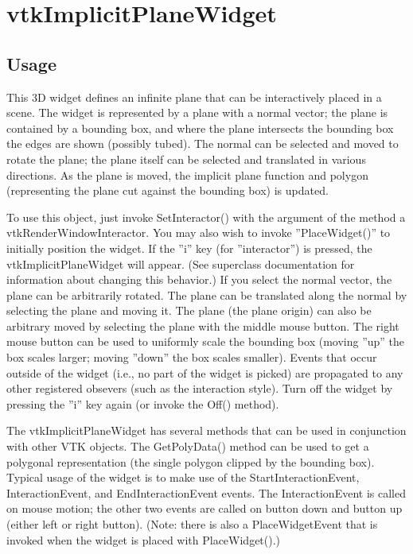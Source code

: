 \section{vtkImplicitPlaneWidget}

\subsection{Usage}

 This 3D widget defines an infinite plane that can be interactively placed
 in a scene. The widget is represented by a plane with a normal vector; the
 plane is contained by a bounding box, and where the plane intersects the
 bounding box the edges are shown (possibly tubed). The normal can be
 selected and moved to rotate the plane; the plane itself can be selected
 and translated in various directions. As the plane is moved, the implicit
 plane function and polygon (representing the plane cut against the bounding
 box) is updated.

 To use this object, just invoke SetInteractor() with the argument of the
 method a vtkRenderWindowInteractor.  You may also wish to invoke
 ''PlaceWidget()'' to initially position the widget. If the ''i'' key (for
 ''interactor'') is pressed, the vtkImplicitPlaneWidget will appear. (See
 superclass documentation for information about changing this behavior.)
 If you select the normal vector, the plane can be arbitrarily rotated. The
 plane can be translated along the normal by selecting the plane and moving
 it. The plane (the plane origin) can also be arbitrary moved by selecting
 the plane with the middle mouse button. The right mouse button can be used
 to uniformly scale the bounding box (moving ''up'' the box scales larger;
 moving ''down'' the box scales smaller). Events that occur outside of the
 widget (i.e., no part of the widget is picked) are propagated to any other
 registered obsevers (such as the interaction style).  Turn off the widget
 by pressing the ''i'' key again (or invoke the Off() method).

 The vtkImplicitPlaneWidget has several methods that can be used in
 conjunction with other VTK objects.  The GetPolyData() method can be used
 to get a polygonal representation (the single polygon clipped by the
 bounding box).  Typical usage of the widget is to make use of the
 StartInteractionEvent, InteractionEvent, and EndInteractionEvent
 events. The InteractionEvent is called on mouse motion; the other two
 events are called on button down and button up (either left or right
 button). (Note: there is also a PlaceWidgetEvent that is invoked when
 the widget is placed with PlaceWidget().)

